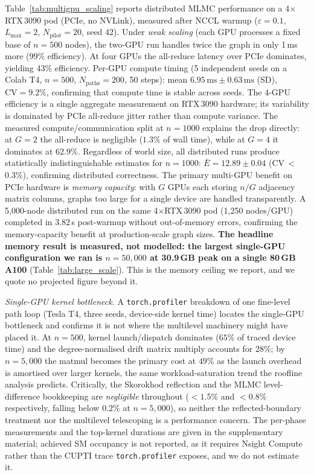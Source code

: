 \documentclass{ieeeaccess}
\begin{document}
Table~\ref{tab:multigpu_scaling} reports distributed MLMC performance on a 4$\times$RTX\,3090
pod (PCIe, no NVLink), measured after NCCL warmup ($\varepsilon{=}0.1$, $L_{\max}{=}2$,
$N_{\mathrm{pilot}}{=}20$, seed 42). Under \emph{weak scaling} (each GPU processes a fixed
base of $n{=}500$ nodes), the two-GPU run handles twice the graph in only 1\,ms more
(99\% efficiency). At four GPUs the all-reduce latency over PCIe dominates, yielding 43\%
efficiency. Per-GPU compute timing (5 independent seeds on a Colab T4, $n{=}500$,
$N_\mathrm{paths}{=}200$, 50 steps): mean $6.95\,\mathrm{ms} \pm 0.63\,\mathrm{ms}$ (SD),
$\mathrm{CV}{=}9.2\%$, confirming that compute time is stable across seeds. The 4-GPU
efficiency is a single aggregate measurement on RTX\,3090 hardware; its variability is
dominated by PCIe all-reduce jitter rather than compute variance. The measured
compute/communication split at $n{=}1000$ explains the drop directly: at $G{=}2$ the all-reduce
is negligible ($1.3\%$ of wall time), while at $G{=}4$ it dominates at $62.9\%$. Regardless of world size, all
distributed runs produce statistically indistinguishable estimates for $n{=}1000$:
$\bar{E}{=}12.89\pm0.04$ (CV\,$<$\,0.3\%), confirming distributed correctness. The primary
multi-GPU benefit on PCIe hardware is \emph{memory capacity}: with $G$ GPUs each storing
$n/G$ adjacency matrix columns, graphs too large for a single device are handled transparently.
A 5,000-node distributed run on the same 4$\times$RTX\,3090 pod (1,250 nodes/GPU) completed
in 3.82\,s post-warmup without out-of-memory errors, confirming the memory-capacity benefit
at production-scale graph sizes. \textbf{The headline memory result is measured, not
modelled: the largest single-GPU configuration we ran is $n{=}50{,}000$ at 30.9\,GB peak on a
single 80\,GB A100} (Table~\ref{tab:large_scale}). This is the memory ceiling we report, and we
quote no projected figure beyond it.

\textit{Single-GPU kernel bottleneck.}
A \texttt{torch.profiler} breakdown of one fine-level path loop (Tesla T4, three seeds,
device-side kernel time) locates the single-GPU bottleneck and confirms it is not where the
multilevel machinery might have placed it. At $n{=}500$, kernel launch/dispatch dominates
($65\%$ of traced device time) and the degree-normalised drift matrix multiply accounts for
$28\%$; by $n{=}5{,}000$ the matmul becomes the primary cost at $49\%$ as the launch overhead is
amortised over larger kernels, the same workload-saturation trend the roofline analysis
predicts. Critically, the Skorokhod reflection and the MLMC level-difference bookkeeping are
\emph{negligible} throughout ($<1.5\%$ and $<0.8\%$ respectively, falling below $0.2\%$ at
$n{=}5{,}000$), so neither the reflected-boundary treatment nor the multilevel telescoping is a
performance concern. The per-phase measurements and the top-kernel durations are given in the
supplementary material; achieved SM occupancy is not reported, as it requires Nsight Compute
rather than the CUPTI trace \texttt{torch.profiler} exposes, and we do not estimate it.
\end{document}
